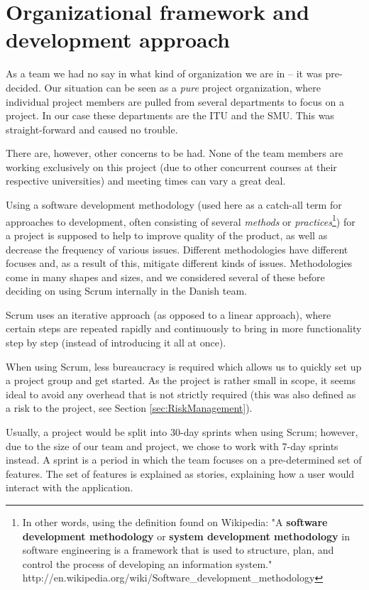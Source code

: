 \section{Organizational framework and development approach}
\label{sec:EmpiriOrganizational}
\label{sec:organizational}

As a team we had no say in what kind of organization we are in – it was pre-decided. Our
situation can be seen as a \emph{pure} project organization\cite{caye}, where individual project members are
pulled from several departments to focus on a project. In our case these departments are the
ITU and the SMU. This was straight-forward and caused no trouble.

There are, however, other concerns to be had. None of the team members are working exclusively
on this project (due to other concurrent courses at their respective universities) and meeting
times can vary a great deal.


Using a software development methodology (used here as a catch-all term for approaches to
development, often consisting of several \emph{methods} or \emph{practices}\footnote{In other
words, using the definition found on Wikipedia: "A \textbf{software development methodology}
or \textbf{system development methodology} in software engineering is a framework that is used
to structure, plan, and control the process of developing an information system."
http://en.wikipedia.org/wiki/Software_development_methodology}) for a project is supposed to help to
improve quality of the product, as well as decrease the frequency of various issues. Different
methodologies have different focuses and, as a result of this, mitigate different kinds of issues.
Methodologies come in many shapes and sizes, and we considered several of these before deciding
on using Scrum internally in the Danish team.

Scrum uses an iterative approach (as opposed to a linear approach), where certain steps are
repeated rapidly and continuously to bring in more functionality step by step (instead of
introducing it all at once).

When using Scrum, less bureaucracy is required\cite{caye} which allows us to quickly set up a project
group and get started. As the project is rather small in scope, it seems ideal to avoid any overhead
that is not strictly required (this was also defined as a risk to the project, see Section \ref{sec:RiskManagement}).

Usually, a project would be split into 30-day sprints when using Scrum; however, due to the size of
our team and project, we chose to work with 7-day sprints instead. A sprint is a period in which the
team focuses on a pre-determined set of features. The set of features is explained as stories,
explaining how a user would interact with the application.

